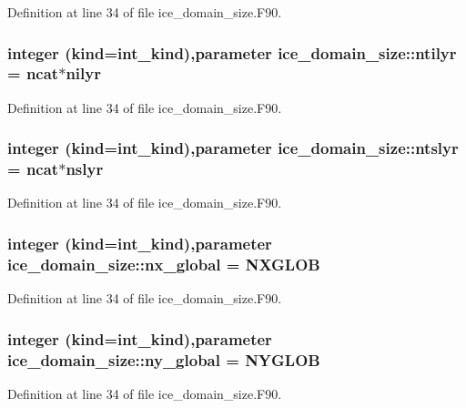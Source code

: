 Definition at line 34 of file ice\_\-domain\_\-size.F90.\hypertarget{namespaceice__domain__size_a46a923e86a6a0f553260f445f9faf5c9}{
\subsubsection[{ntilyr}]{\setlength{\rightskip}{0pt plus 5cm}integer (kind=int\_\-kind),parameter {\bf ice\_\-domain\_\-size::ntilyr} = {\bf ncat}$\ast${\bf nilyr}}}
\label{namespaceice__domain__size_a46a923e86a6a0f553260f445f9faf5c9}


Definition at line 34 of file ice\_\-domain\_\-size.F90.\hypertarget{namespaceice__domain__size_a2b95950726524c87034f6468ba946b2a}{
\subsubsection[{ntslyr}]{\setlength{\rightskip}{0pt plus 5cm}integer (kind=int\_\-kind),parameter {\bf ice\_\-domain\_\-size::ntslyr} = {\bf ncat}$\ast${\bf nslyr}}}
\label{namespaceice__domain__size_a2b95950726524c87034f6468ba946b2a}


Definition at line 34 of file ice\_\-domain\_\-size.F90.\hypertarget{namespaceice__domain__size_aefcbe884e789decfd40a43558e59ce6f}{
\subsubsection[{nx\_\-global}]{\setlength{\rightskip}{0pt plus 5cm}integer (kind=int\_\-kind),parameter {\bf ice\_\-domain\_\-size::nx\_\-global} = NXGLOB}}
\label{namespaceice__domain__size_aefcbe884e789decfd40a43558e59ce6f}


Definition at line 34 of file ice\_\-domain\_\-size.F90.\hypertarget{namespaceice__domain__size_ae668c8c91f91c2a63ce14581f198e1af}{
\subsubsection[{ny\_\-global}]{\setlength{\rightskip}{0pt plus 5cm}integer (kind=int\_\-kind),parameter {\bf ice\_\-domain\_\-size::ny\_\-global} = NYGLOB}}
\label{namespaceice__domain__size_ae668c8c91f91c2a63ce14581f198e1af}


Definition at line 34 of file ice\_\-domain\_\-size.F90.